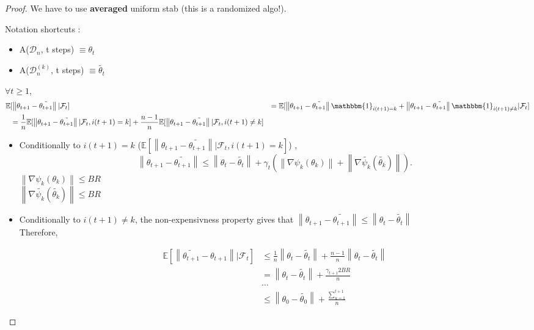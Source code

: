 \begin{proof}
    We have to use \textbf{averaged} uniform stab (this is a randomized algo!).
    
    Notation shortcuts : \begin{itemize}
        \item A($\mathcal{D}_n$, t steps) $\equiv \theta_t$
        \item A($\mathcal{D}_n^{(k)}$, t steps) $\equiv \tilde{\theta_t}$
    \end{itemize}
    
    $\forall t \geq 1$,
    \begin{align*}
        \mathbb{E} 
            & [ \left\| \theta_{t+1} - \tilde{\theta_{t+1}} \right\| | \mathcal{F}_t ]
            & = \mathbb{E}[ \left\| \theta_{t+1} - \tilde{\theta_{t+1}} \right\| \mathbbm{1}_{i(t+1)= k} + \left\| \theta_{t+1} - \tilde{\theta_{t+1}} \right\| \mathbbm{1}_{i(t+1)\neq  k}| \mathcal{F}_t] \\
            & = \frac{1}{n} \mathbb{E}[ \left\| \theta_{t+1} - \tilde{\theta_{t+1}} \right\| | \mathcal{F}_t, i(t+1)= k] + \frac{n-1}{n} \mathbb{E}[ \left\| \theta_{t+1} - \tilde{\theta_{t+1}} \right\| | \mathcal{F}_t, i(t+1) \neq k]
    \end{align*}
    
    \begin{itemize}
        \item Conditionally to $i(t+1) = k$ ($\mathbb{E}[ \left\| \theta_{t+1} - \tilde{\theta_{t+1}} \right\| | \mathcal{F}_t, i(t+1)= k]$) , 
        \[
            \left\| \theta_{t+1} - \tilde{\theta_{t+1}} \right\| \leq \left\| \theta_{t} - \tilde{\theta_{t}} \right\| + \gamma _t ( \left\| \nabla \psi_k (\theta _k) \right\| + \left\| \nabla \tilde{\psi_k} (\tilde{\theta _k}) \right\|)
        .\]
        $\left\| \nabla \psi_k (\theta _k) \right\| \leq BR$ \\
        $\left\| \nabla \tilde{\psi_k} (\tilde{\theta _k}) \right\| \leq BR$

        \item Conditionally to $i(t+1) \neq  k$, the non-expensivness property gives that $\left\|  \theta_{t+1} - \tilde{\theta_{t+1}} \right\| \leq \left\|  \theta_{t} - \tilde{\theta_{t}} \right\|$ \\
        Therefore,
        
        \begin{align*}
            \mathbb{E}[ \left\| \tilde{\theta_{t+1}} - \theta_{t+1} \right\| | \mathcal{F}_t] &\leq \frac{1}{n} \left\| \theta_{t} - \tilde{\theta_{t}} \right\| + \frac{n-1}{n} \left\| \theta_{t} - \tilde{\theta_{t}} \right\| \\
            & = \left\| \theta_{t} - \tilde{\theta_{t}} \right\| + \frac{\gamma _ {t+1} 2BR}{n} \\
            & \dots \\
            & \leq \left\| \theta_0 - \tilde{\theta _0} \right\|  + \frac{\sum_{u=1}^{t+1}}{n}
        \end{align*}


\end{itemize}
\end{proof}
